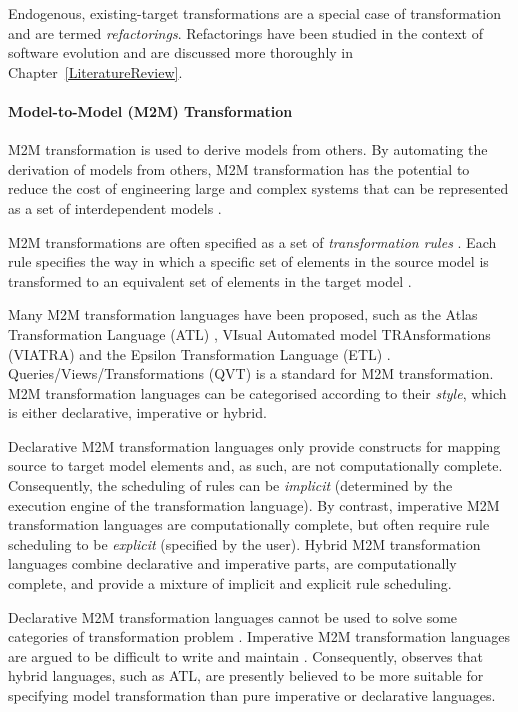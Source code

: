 Endogenous, existing-target transformations are a special case of transformation and are termed \emph{refactorings}. Refactorings have been studied in the context of software evolution and are discussed more thoroughly in Chapter~\ref{LiteratureReview}.


\paragraph{Model-to-Model (M2M) Transformation} M2M transformation is used to derive models from others. By automating the derivation of models from others, M2M transformation has the potential to reduce the cost of engineering large and complex systems that can be represented as a set of interdependent models \cite{sendall03heart}. 

M2M transformations are often specified as a set of \emph{transformation rules} \cite{czarnecki06survey}. Each rule specifies the way in which a specific set of elements in the source model is transformed to an equivalent set of elements in the target model \cite[pg.44]{kolovos09thesis}.

Many M2M transformation languages have been proposed, such as the Atlas Transformation Language (ATL) \cite{jouault05transforming}, VIsual Automated model TRAnsformations (VIATRA) \cite{VIATRA} and the Epsilon Transformation Language (ETL) \cite{kolovos08etl}. Qu\-er\-ies/Vi\-ews/Tra\-nsfo\-rma\-ti\-ons (QVT) \cite{qvt} is a standard for M2M transformation. M2M transformation languages can be categorised according to their \emph{style}, which is either declarative, imperative or hybrid.

Declarative M2M transformation languages only provide constructs for mapping source to target model elements and, as such, are not computationally complete. Consequently, the scheduling of rules can be \emph{implicit} (determined by the execution engine of the transformation language). By contrast, imperative M2M transformation languages are computationally complete, but often require rule scheduling to be \emph{explicit} (specified by the user). Hybrid M2M transformation languages combine declarative and imperative parts, are computationally complete, and provide a mixture of implicit and explicit rule scheduling.

Declarative M2M transformation languages cannot be used to solve some categories of transformation problem \cite{patrascoiu04embedding}. Imperative M2M transformation languages are argued to be difficult to write and maintain \cite[pg.45]{kolovos09thesis}. Consequently, \cite{kolovos08etl} observes that hybrid languages, such as ATL, are presently believed to be more suitable for specifying model transformation than pure imperative or declarative languages.

